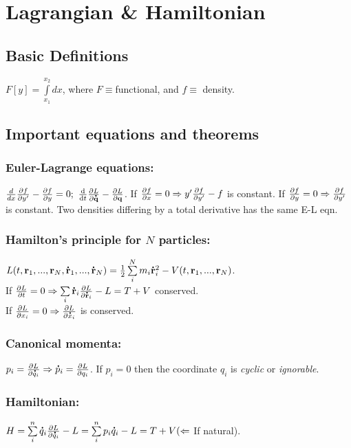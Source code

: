 \section{Lagrangian \& Hamiltonian}



\subsection{Basic Definitions}
$F[y]=\int\limits_{x_{1}}^{x_{2}}dx$, where $F\equiv$functional, and $f\equiv$ density.



\subsection{Important equations and theorems}
\subsubsection*{Euler-Lagrange equations:}$\frac{d}{dx}\partials{f}{y'}-\partials{f}{y}=0;\ \frac{\text{d}}{\text{d}t}\partials{L}{\dotv{q}}-\partials{L}{\vec{q}}$. If $\pdv{f}{x}=0\Rightarrow y'\pdv{f}{y'}-f$ is constant. If $\pdv{f}{y}=0\Rightarrow \pdv{f}{y'}$ is constant. Two densities differing by a total derivative has the same E-L eqn.
\\[0.5em]
\subsubsection*{Hamilton's principle for $N$ particles:}
$L(t,\mathbf{r}_{1},...,\mathbf{r}_{N},\accentset{\mbox{\bfseries .}}{\mathbf{r}}_{1},...,\accentset{\mbox{\bfseries .}}{\mathbf{r}}_{N})=\frac{1}{2}\sum\limits_{i}^{N}m_{i}\accentset{\mbox{\bfseries .}}{\mathbf{r}}_{i}^{2}-V(t,\mathbf{r}_{1},...,\mathbf{r}_{N})$.\\ If $\pdv{L}{t}=0\Rightarrow \sum\limits_{i}\accentset{\mbox{\bfseries .}}{\mathbf{r}}_{i}\pdv{L}{ \accentset{\mbox{\bfseries .}}{\mathbf{r}}_{i}}-L=T+V$ conserved.
\\
If $\pdv{L}{x_{i}}=0\Rightarrow \pdv{L}{ \accentset{\mbox{\bfseries .}}{x}_{i}}$ is conserved.
\\
\subsubsection*{Canonical momenta:} $p_{i}=\pdv{L}{ \accentset{\mbox{\bfseries .}}{q}_{i}}\Rightarrow \accentset{\mbox{\bfseries .}}{p}_{i}=\pdv{L}{q_{i}}$. If $p_{i}=0$ then the coordinate $q_{i}$ is \emph{cyclic} or \emph{ignorable}.
\\
\subsubsection*{Hamiltonian:} $H=\sum\limits_{i}^{n}\accentset{\mbox{\bfseries .}}{q}_{i}\pdv{L}{ \accentset{\mbox{\bfseries .}}{q}_{i}}-L=\sum\limits_{i}^{n}p_{i}\accentset{\mbox{\bfseries .}}{q}_{i}-L=T+V(\Leftarrow$ If natural).
\\
